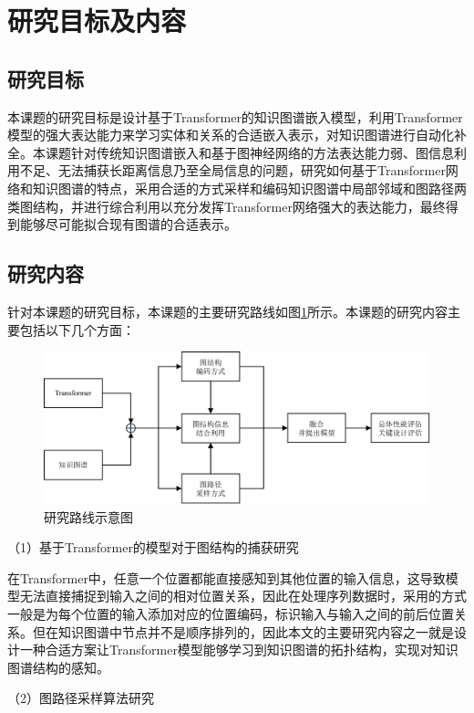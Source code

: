 \section{研究目标及内容}
\subsection{研究目标}
本课题的研究目标是设计基于Transformer的知识图谱嵌入模型，利用Transformer模型的强大表达能力来学习实体和关系的合适嵌入表示，对知识图谱进行自动化补全。本课题针对传统知识图谱嵌入和基于图神经网络的方法表达能力弱、图信息利用不足、无法捕获长距离信息乃至全局信息的问题，研究如何基于Transformer网络和知识图谱的特点，采用合适的方式采样和编码知识图谱中局部邻域和图路径两类图结构，并进行综合利用以充分发挥Transformer网络强大的表达能力，最终得到能够尽可能拟合现有图谱的合适表示。

\subsection{研究内容}


针对本课题的研究目标，本课题的主要研究路线如图\ref{research_route}所示。本课题的研究内容主要包括以下几个方面：

\begin{figure}[htb]
  \centerline{\includegraphics[width=1\textwidth]{pic/research_route.pdf}}
  \caption{研究路线示意图}
  \label{research_route}
\end{figure}

（1）基于Transformer的模型对于图结构的捕获研究

在Transformer中，任意一个位置都能直接感知到其他位置的输入信息，这导致模型无法直接捕捉到输入之间的相对位置关系，因此在处理序列数据时，采用的方式一般是为每个位置的输入添加对应的位置编码，标识输入与输入之间的前后位置关系。但在知识图谱中节点并不是顺序排列的，因此本文的主要研究内容之一就是设计一种合适方案让Transformer模型能够学习到知识图谱的拓扑结构，实现对知识图谱结构的感知。

（2）图路径采样算法研究

